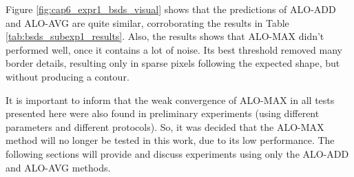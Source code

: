 \begin{figure*}
  \centering
  \caption{Predictions of the ALO-ADD, ALO-AVG and ALO-MAX networks, and its best thresholds.}
  \captionsetup[subfigure]{labelformat=empty}
  \hfill
  \hfill
  \hfill
  
  \hfill
  \hfill
  \hfill
  \sourceOwn
  \label{fig:cap6_expr1_bsds_visual}
\end{figure*}

Figure \ref{fig:cap6_expr1_bsds_visual} shows that the predictions of ALO-ADD and ALO-AVG are quite similar, corroborating the results in Table \ref{tab:bsds_subexp1_results}.
Also, the results shows that ALO-MAX didn't performed well, once it contains a lot of noise.
Its best threshold removed many border details, resulting only in sparse pixels following the expected shape, but without producing a contour.

It is important to inform that the weak convergence of ALO-MAX in all tests presented here were also found in preliminary experiments (using different parameters and different protocols).
So, it was decided that the ALO-MAX method will no longer be tested in this work, due to its low performance.
The following sections will provide and discuss experiments using only the ALO-ADD and ALO-AVG methods.

